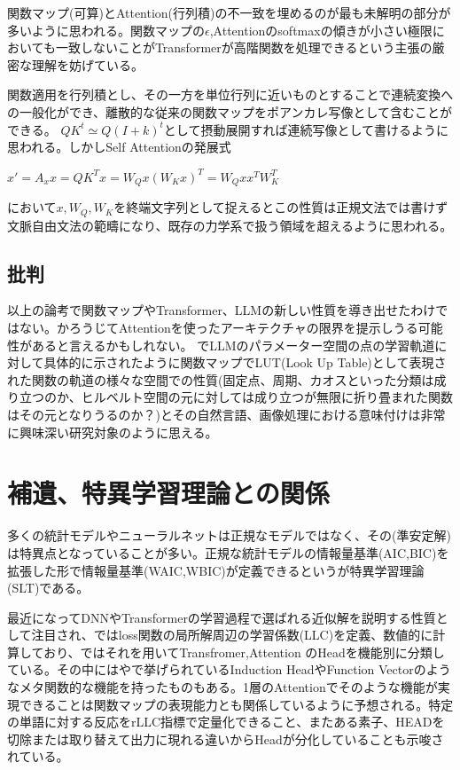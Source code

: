 \documentclass[a4paper,11pt]{article}
\begin{document}
関数マップ(可算)とAttention(行列積)の不一致を埋めるのが最も未解明の部分が多いように思われる。関数マップの$\epsilon$,Attentionのsoftmaxの傾きが小さい極限においても一致しないことがTransformerが高階関数を処理できるという主張の厳密な理解を妨げている。

関数適用を行列積とし、その一方を単位行列に近いものとすることで連続変換への一般化ができ、離散的な従来の関数マップをポアンカレ写像として含むことができる。
$QK^t\simeq Q(I+k)^t$として摂動展開すれば連続写像として書けるように思われる。しかしSelf Attentionの発展式

$x'=A_x x=QK^T x=W_Q x(W_K x)^T=W_Q x x^T W_K^T$

において$x,W_Q,W_K$を終端文字列として捉えるとこの性質は正規文法では書けず文脈自由文法の範疇になり、既存の力学系で扱う領域を超えるように思われる。

\subsection{批判}
以上の論考で関数マップやTransformer、LLMの新しい性質を導き出せたわけではない。かろうじてAttentionを使ったアーキテクチャの限界を提示しうる可能性があると言えるかもしれない。
\cite{Inoue_2022}でLLMのパラメーター空間の点の学習軌道に対して具体的に示されたように関数マップでLUT(Look Up Table)として表現された関数の軌道の様々な空間での性質(固定点、周期、カオスといった分類は成り立つのか、ヒルベルト空間の元に対しては成り立つが無限に折り畳まれた関数はその元となりうるのか？)とその自然言語、画像処理における意味付けは非常に興味深い研究対象のように思える。

\section{補遺、特異学習理論との関係}
多くの統計モデルやニューラルネットは正規なモデルではなく、その(準安定解)は特異点となっていることが多い。正規な統計モデルの情報量基準(AIC,BIC)を拡張した形で情報量基準(WAIC,WBIC)が定義できるというが特異学習理論(SLT)である\cite{Wata2009}。

最近になってDNNやTransformerの学習過程で選ばれる近似解を説明する性質として注目され、\cite{lau2024LLC}ではloss関数の局所解周辺の学習係数(LLC)を定義、数値的に計算しており、\cite{wang2024differentiationspecializationattentionheads}ではそれを用いてTransfromer,Attention のHeadを機能別に分類している。その中には\cite{funcvec}や\cite{olsson2022incontextlearninginductionheads}で挙げられているInduction HeadやFunction Vectorのようなメタ関数的な機能を持ったものもある。1層のAttentionでそのような機能が実現できることは関数マップの表現能力とも関係しているように予想される。特定の単語に対する反応をrLLC指標で定量化できること、またある素子、HEADを切除または取り替えて出力に現れる違いからHeadが分化していることも示唆されている。



\end{document}
